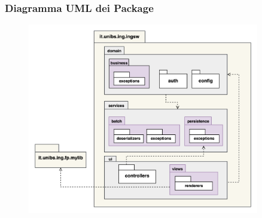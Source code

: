 \begin{frame}
    \frametitle{Diagramma UML dei Package}
    \begin{figure}
        \includegraphics[width=0.9\textwidth]{img/UMLpackage.png}
    \end{figure}
\end{frame}